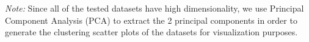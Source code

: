 \textit{Note:} Since all of the tested datasets have high dimensionality, we use Principal Component Analysis (PCA) to extract the 2 principal components in order to generate the clustering scatter plots of the datasets for visualization purposes.



